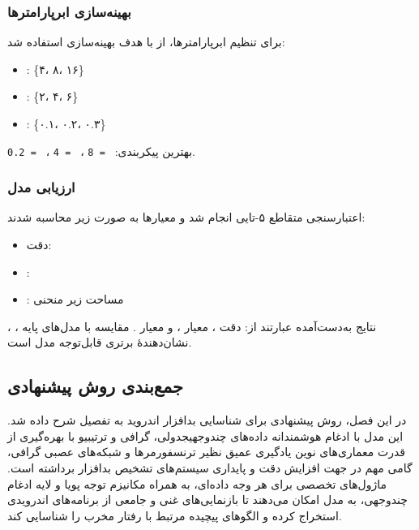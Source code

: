 \subsubsection{بهینه‌سازی ابرپارامترها}
برای تنظیم ابرپارامترها، از  با هدف بهینه‌سازی  استفاده شد:
\begin{itemize}
    \renewcommand{\labelitemi}{\lr{$\bullet$}}
    \item {}: \{۴، ۸، ۱۶\}
    \item {}: \{۲، ۴، ۶\}
    \item {}: \{۰.۱، ۰.۲، ۰.۳\}
\end{itemize}
بهترین پیکربندی: \texttt{ = 8} ، \texttt{ = 4} ، \texttt{ = 0.2}.

\subsubsection{ارزیابی مدل}
اعتبارسنجی متقاطع ۵-تایی انجام شد و معیارها به صورت زیر محاسبه شدند:
\begin{itemize}
    \renewcommand{\labelitemi}{\lr{$\bullet$}}
    \item دقت: 
    \item {}: 
    \item {}: مساحت زیر منحنی 
\end{itemize}

نتایج به‌دست‌آمده عبارتند از: دقت ، معیار ، و معیار . مقایسه با مدل‌های پایه ، ،  نشان‌دهندهٔ برتری قابل‌توجه مدل \textbf{} است.

\subsection{جمع‌بندی روش پیشنهادی}
در این فصل، روش پیشنهادی \textbf{} برای شناسایی بدافزار اندروید به تفصیل شرح داده شد. این مدل با ادغام هوشمندانه داده‌های چندوجهیجدولی، گرافی و ترتیبیو با بهره‌گیری از قدرت معماری‌های نوین یادگیری عمیق نظیر ترنسفورمرها و شبکه‌های عصبی گرافی، گامی مهم در جهت افزایش دقت و پایداری سیستم‌های تشخیص بدافزار برداشته است. ماژول‌های تخصصی برای هر وجه داده‌ای، به همراه مکانیزم توجه پویا و لایه ادغام چندوجهی، به مدل امکان می‌دهند تا بازنمایی‌های غنی و جامعی از برنامه‌های اندرویدی استخراج کرده و الگوهای پیچیده مرتبط با رفتار مخرب را شناسایی کند.

